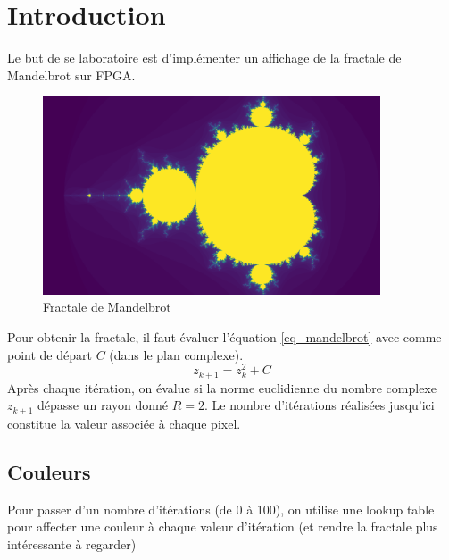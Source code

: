 \documentclass[LPSC_Labo03_SDeriaz]{subfiles}
\begin{document}
\section{Introduction}
Le but de se laboratoire est d'implémenter un affichage de la fractale de Mandelbrot sur FPGA.
\begin{figure}[H]
\centering
\includegraphics[width=10cm]{mandelbrot.png}
\caption{Fractale de Mandelbrot}
\end{figure}
Pour obtenir la fractale, il faut évaluer l'équation \ref{eq_mandelbrot} avec comme point de départ $C$ (dans le plan complexe).
\begin{equation}
z_{k+1}=z_{k}^2+C
\label{eq_mandelbrot}
\end{equation}
Après chaque itération, on évalue si la norme euclidienne du nombre complexe $z_{k+1}$ dépasse un rayon donné $R=2$. Le nombre d'itérations réalisées jusqu'ici constitue la valeur associée à chaque pixel.
\subsection{Couleurs}
Pour passer d'un nombre d'itérations (de 0 à 100), on utilise une lookup table pour affecter une couleur à chaque valeur d'itération (et rendre la fractale plus intéressante à regarder)
\end{document}
